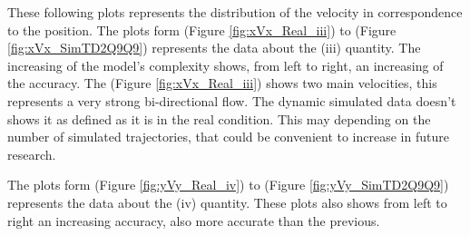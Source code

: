 \documentclass[class=article, crop=false]{standalone}
\begin{document}
\newpage
These following plots represents the distribution of the velocity in correspondence to the position.
The plots form (Figure \ref{fig:xVx_Real_iii}) to (Figure \ref{fig:xVx_SimTD2Q9Q9}) represents the data about the (iii) quantity.
The increasing of the model's complexity shows, from left to right, an increasing of the accuracy.
The (Figure \ref{fig:xVx_Real_iii}) shows two main velocities, this represents a very strong bi-directional flow.
The dynamic simulated data doesn't shows it as defined as it is in the real condition.
This may depending on the number of simulated trajectories, that could be convenient to increase in future research.

The plots form (Figure \ref{fig:yVy_Real_iv}) to (Figure \ref{fig:yVy_SimTD2Q9Q9}) represents the data about the (iv) quantity.
These plots also shows from left to right an increasing accuracy, also more accurate than the previous.
\end{document}
